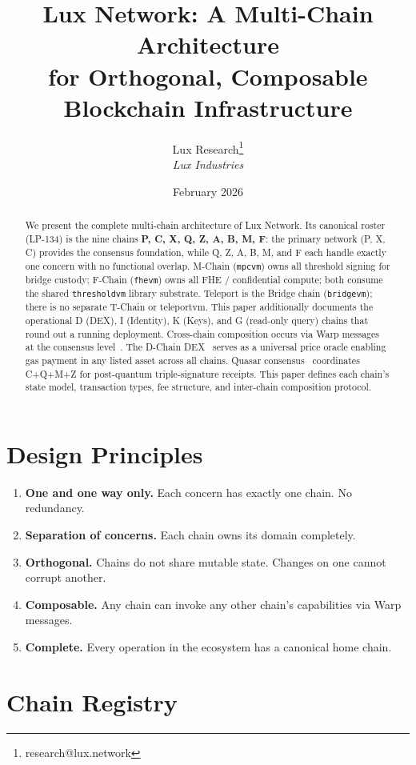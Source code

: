 \documentclass[11pt,a4paper]{article}
\title{\textbf{Lux Network: A Multi-Chain Architecture\\for Orthogonal, Composable Blockchain Infrastructure}}
\author{Lux Research\thanks{research@lux.network}\\
\textit{Lux Industries}}
\date{February 2026}
\begin{document}
\luxcoverpage

\begin{abstract}
We present the complete multi-chain architecture of Lux Network. Its canonical roster (LP-134) is the nine chains \textbf{P, C, X, Q, Z, A, B, M, F}: the primary network (P, X, C) provides the consensus foundation, while Q, Z, A, B, M, and F each handle exactly one concern with no functional overlap. M-Chain (\texttt{mpcvm}) owns all threshold signing for bridge custody; F-Chain (\texttt{fhevm}) owns all FHE / confidential compute; both consume the shared \texttt{thresholdvm} library substrate. Teleport is the Bridge chain (\texttt{bridgevm}); there is no separate T-Chain or teleportvm. This paper additionally documents the operational D (DEX), I (Identity), K (Keys), and G (read-only query) chains that round out a running deployment. Cross-chain composition occurs via Warp messages at the consensus level~\cite{lux-bridge}. The D-Chain DEX~\cite{lux-dex} serves as a universal price oracle enabling gas payment in any listed asset across all chains. Quasar consensus~\cite{lux-consensus} coordinates C+Q+M+Z for post-quantum triple-signature receipts. This paper defines each chain's state model, transaction types, fee structure, and inter-chain composition protocol.
\end{abstract}

\section{Design Principles}

\begin{enumerate}
\item \textbf{One and one way only.} Each concern has exactly one chain. No redundancy.
\item \textbf{Separation of concerns.} Each chain owns its domain completely.
\item \textbf{Orthogonal.} Chains do not share mutable state. Changes on one cannot corrupt another.
\item \textbf{Composable.} Any chain can invoke any other chain's capabilities via Warp messages.
\item \textbf{Complete.} Every operation in the ecosystem has a canonical home chain.
\end{enumerate}

\section{Chain Registry}
\end{document}
